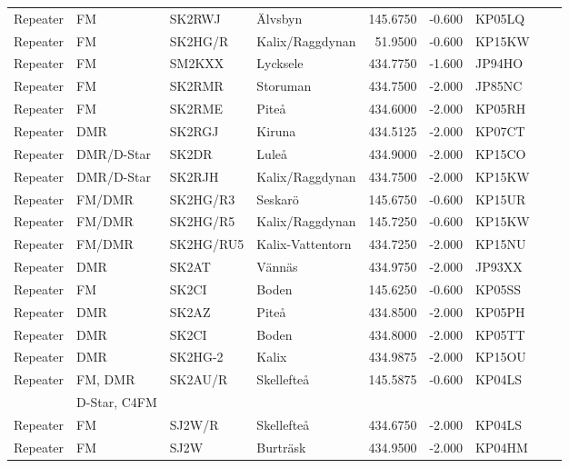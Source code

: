 \begin{longtable}{llllrrlcl}
	Repeater & FM           & SK2RWJ    & Älvsbyn                 &   145.6750 &  -0.600 & KP05LQ &  &  \\
	Repeater & FM           & SK2HG/R   & Kalix/Raggdynan         &    51.9500 &  -0.600 & KP15KW &  &  \\
	Repeater & FM           & SM2KXX    & Lycksele                &   434.7750 &  -1.600 & JP94HO &  &  \\
	Repeater & FM           & SK2RMR    & Storuman                &   434.7500 &  -2.000 & JP85NC &  &  \\
	Repeater & FM           & SK2RME    & Piteå                   &   434.6000 &  -2.000 & KP05RH &  &  \\
	Repeater & DMR          & SK2RGJ    & Kiruna                  &   434.5125 &  -2.000 & KP07CT &  &  \\
	Repeater & DMR/D-Star   & SK2DR     & Luleå                   &   434.9000 &  -2.000 & KP15CO &  &  \\
	Repeater & DMR/D-Star   & SK2RJH    & Kalix/Raggdynan         &   434.7500 &  -2.000 & KP15KW &  &  \\
	Repeater & FM/DMR       & SK2HG/R3  & Seskarö                 &   145.6750 &  -0.600 & KP15UR &  &  \\
	Repeater & FM/DMR       & SK2HG/R5  & Kalix/Raggdynan         &   145.7250 &  -0.600 & KP15KW &  &  \\
	Repeater & FM/DMR       & SK2HG/RU5 & Kalix-Vattentorn        &   434.7250 &  -2.000 & KP15NU &  &  \\
	Repeater & DMR          & SK2AT     & Vännäs                  &   434.9750 &  -2.000 & JP93XX &  &  \\
	Repeater & FM           & SK2CI     & Boden                   &   145.6250 &  -0.600 & KP05SS &  &  \\
	Repeater & DMR          & SK2AZ     & Piteå                   &   434.8500 &  -2.000 & KP05PH &  &  \\
	Repeater & DMR          & SK2CI     & Boden                   &   434.8000 &  -2.000 & KP05TT &  &  \\
	Repeater & DMR          & SK2HG-2   & Kalix                   &   434.9875 &  -2.000 & KP15OU &  &  \\
	Repeater & FM, DMR      & SK2AU/R   & Skellefteå              &   145.5875 &  -0.600 & KP04LS &  &  \\
	         & D-Star, C4FM &           &                         &            &         &        &  &  \\
	Repeater & FM           & SJ2W/R    & Skellefteå              &   434.6750 &  -2.000 & KP04LS &  &  \\
	Repeater & FM           & SJ2W      & Burträsk                &   434.9500 &  -2.000 & KP04HM &  &
\end{longtable}

